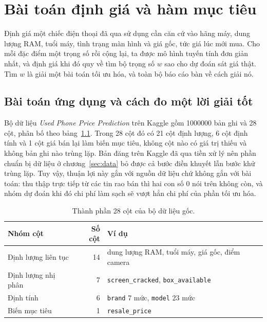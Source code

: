 \chapter{Bài toán định giá và hàm mục tiêu}
\label{sec:problem}

Định giá một chiếc điện thoại đã qua sử dụng cần căn cứ vào hãng máy, dung lượng
RAM, tuổi máy, tình trạng màn hình và giá gốc, tức giá lúc mới mua. Cho mỗi đặc
điểm một trọng số rồi cộng lại, ta được mô hình tuyến tính đơn giản nhất, và định
giá khi đó quy
về tìm bộ trọng số $w$ sao cho dự đoán sát giá thật. Tìm $w$ là giải một bài toán
tối ưu hóa, và toàn bộ báo cáo bàn về cách giải nó.

\section{Bài toán ứng dụng và cách đo một lời giải tốt}
\label{sec:application}

Bộ dữ liệu \emph{Used Phone Price Prediction} trên Kaggle gồm \num{1000000} bản
ghi và 28 cột, phân bố theo bảng~\ref{tab:dataset}. Trong 28 cột đó có 21 cột
định lượng, 6 cột định tính và 1 cột giá bán lại làm biến mục tiêu, không cột nào
có giá trị thiếu và không bản ghi nào trùng lặp. Bản đăng trên Kaggle đã qua tiền
xử lý nên phần chuẩn bị dữ liệu ở chương~\ref{sec:data} bỏ được cả bước điền
khuyết lẫn bước khử trùng lặp. Tuy vậy, thuận lợi này gắn với nguồn dữ liệu chứ
không gắn với bài toán: thu thập trực tiếp từ các tin rao bán thì hai con số 0
nói trên không còn, và nhóm dự đoán khi đó chi phí làm sạch sẽ vượt hẳn chi phí
của phần tối ưu hóa.

\begin{table}[tp]
  \centering
  \caption{Thành phần 28 cột của bộ dữ liệu gốc.}
  \label{tab:dataset}
  \begin{tabular}{lrl}
    \toprule
    Nhóm cột & Số cột & Ví dụ \\
    \midrule
    Định lượng liên tục & 14 & dung lượng RAM, tuổi máy, giá gốc, điểm camera \\
    Định lượng nhị phân & 7  & \texttt{screen\_cracked}, \texttt{box\_available} \\
    Định tính           & 6  & \texttt{brand} 7 mức, \texttt{model} 23 mức \\
    Biến mục tiêu       & 1  & \texttt{resale\_price} \\
    \bottomrule
  \end{tabular}
\end{table}


